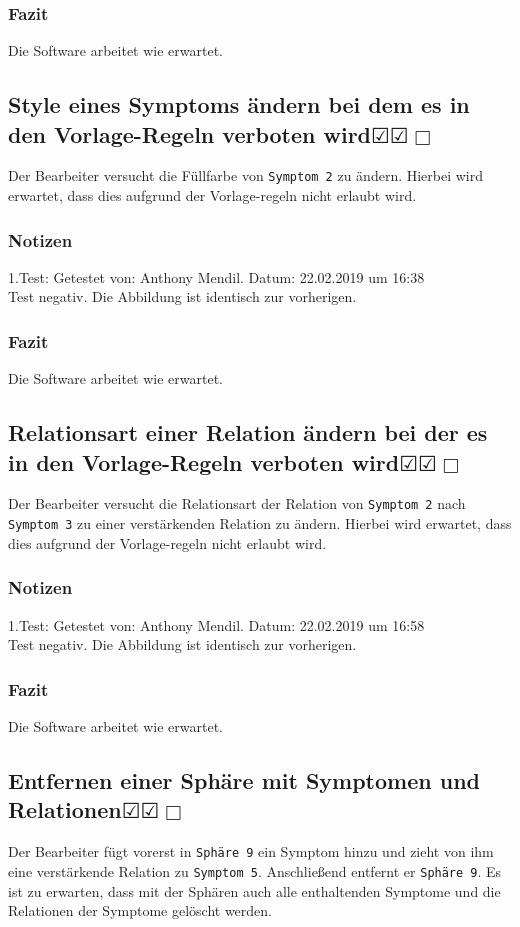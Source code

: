 \documentclass{scrartcl}
\newcommand{\subsectiont}[2]{\subsection[#1]{#1{\normalsize\normalfont #2}}}
\newcommand{\leer}{$\Box$}
\newcommand{\ok}{$\CheckedBox$}
\begin{document}
\subsubsection{Fazit}
Die Software arbeitet wie erwartet.

\subsectiont{Style eines Symptoms ändern bei dem es in den Vorlage-Regeln verboten wird}{\dotfill\ok\ok\leer}
Der Bearbeiter versucht die Füllfarbe von \texttt{Symptom 2} zu ändern. Hierbei wird erwartet, dass dies aufgrund der Vorlage-regeln nicht erlaubt wird.
\subsubsection{Notizen}
1.Test: Getestet von: Anthony Mendil. Datum: 22.02.2019 um 16:38 \\
Test negativ. Die Abbildung ist identisch zur vorherigen.
\subsubsection{Fazit}
Die Software arbeitet wie erwartet.

\subsectiont{Relationsart einer Relation ändern bei der es in den Vorlage-Regeln verboten wird}{\dotfill\ok\ok\leer}
Der Bearbeiter versucht die Relationsart der Relation von \texttt{Symptom 2} nach \texttt{Symptom 3} zu einer verstärkenden Relation zu ändern. Hierbei wird erwartet, dass dies aufgrund der Vorlage-regeln nicht erlaubt wird.
\subsubsection{Notizen}
1.Test: Getestet von: Anthony Mendil. Datum: 22.02.2019 um 16:58 \\
Test negativ. Die Abbildung ist identisch zur vorherigen.
\subsubsection{Fazit}
Die Software arbeitet wie erwartet.

\subsectiont{Entfernen einer Sphäre mit Symptomen und Relationen}{\dotfill\ok\ok\leer}
Der Bearbeiter fügt vorerst in \texttt{Sphäre 9} ein Symptom hinzu und zieht von ihm eine verstärkende Relation zu \texttt{Symptom 5}. Anschließend entfernt er \texttt{Sphäre 9}. Es ist zu erwarten, dass mit der Sphären auch alle enthaltenden Symptome und die Relationen der Symptome gelöscht werden. 
\end{document}
